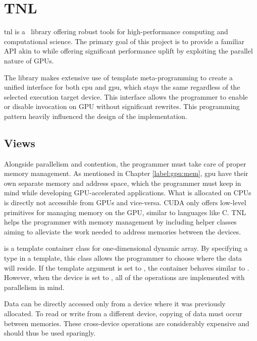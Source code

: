 \section{TNL}

\acrfull{tnl} \cite{tnl} is a \CC\ library offering robust tools for high-performance computing and computational science. The primary goal of this project is to provide a familiar API akin to  while offering significant performance uplift by exploiting the parallel nature of GPUs.

The library makes extensive use of template meta-programming to create a unified interface for both \acrshort{cpu} and \acrshort{gpu}, which stays the same regardless of the selected execution target device. This interface allows the programmer to enable or disable invocation on GPU without significant rewrites. This programming pattern heavily influenced the design of the implementation.

\subsection{Views}

Alongside parallelism and contention, the programmer must take care of proper memory management. As mentioned in Chapter \ref{label:gpu:mem}, \acrshort{gpu} have their own separate memory and address space, which the programmer must keep in mind while developing GPU-accelerated applications. What is allocated on CPUs is directly not accessible from GPUs and vice-versa. CUDA only offers low-level primitives for managing memory on the GPU, similar to languages like C. TNL helps the programmer with memory management by including helper classes aiming to alleviate the work needed to address memories between the devices.

 is a template container class for one-dimensional dynamic array. By specifying a type in a template, this class allows the programmer to choose where the data will reside. If the template argument is set to , the container behaves similar to . However, when the device is set to , all of the operations are implemented with parallelism in mind.

Data can be directly accessed only from a device where it was previously allocated. To read or write from a different device, copying of data must occur between memories. These cross-device operations are considerably expensive and should thus be used sparingly.


